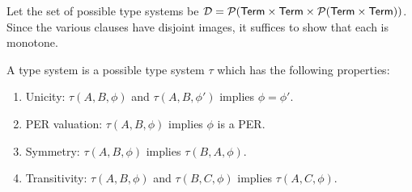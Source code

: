 Let the set of possible type systems be $\mathcal{D} = 
\mathcal{P}(\mathsf{Term} \times \mathsf{Term} \times \mathcal{P}(\mathsf{Term} \times \mathsf{Term}))$.
Since the various clauses have disjoint images, it suffices to show that each is monotone.

\iffalse
\begin{lemma}\label{lemma:monotone}
For all $v \in \mathcal{D}$, $f : \mathcal{D} \to \mathcal{D}, \tau \mapsto \text{Types}(v,\tau)$ is a monotone function.
\end{lemma}

\begin{proof}

\begin{itemize}
\item $\text{Fun}$:\\
Suppose $\tau \subseteq \tau'$. NTS $\text{Fun}(\tau,\tau) \subseteq \text{Fun}(\tau',\tau')$. 
Suppose $(\arr{A}{\varphi}{B}{\varrho}, \arr{A'}{\varphi'}{B'}{\varrho'}, \phi)  \in \text{Fun}(\tau,\tau)$. 
Unrolling the definition, we know:
\begin{enumerate}
  \item there is a $\alpha$ s.t. \sameType{A}{A'}{\alpha}{\tau}. Then by assumption, \sameType{A}{A'}{\alpha}{\tau'}. 
  \item there is a $\beta$ s.t. \fact{\sameTypeOne{a}{\alpha}{B}{B'}{\beta}{\tau}}{1}. We show
\sameTypeOne{a}{\alpha}{B}{B'}{\beta}{\tau'}. Let $v,v'$ s.t. $\alpha(v,v')$, and show 
\sameType{[v/a]B}{[v'/a]B'}{\beta_{v,v'}}{\tau'}. But this holds by \applyAss{1}.
\end{enumerate}
Since the next three constraints are determined by $\alpha$ and $\beta$ which did not change, we conclude 
$(\arr{A}{\varphi}{B}{\varrho}, \arr{A'}{\varphi'}{B'}{\varrho'}, \phi)  \in \text{Fun}(\tau',\tau')$.
\end{itemize}
\end{proof}
\fi

A type system is a possible type system $\tau$ which has the following properties:
\begin{enumerate}
\item Unicity: $\tau(A,B,\phi)$ and $\tau(A,B,\phi')$ implies $\phi = \phi'$.
\item PER valuation: $\tau(A,B,\phi)$ implies $\phi$ is a PER.
\item Symmetry: $\tau(A,B,\phi)$ implies $\tau(B,A,\phi)$. 
\item Transitivity: $\tau(A,B,\phi)$ and $\tau(B,C,\phi)$ implies $\tau(A,C,\phi)$.
\end{enumerate}

